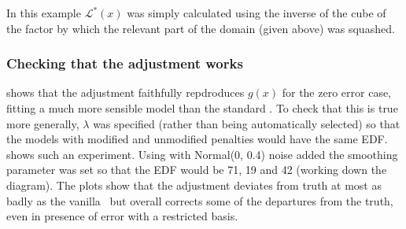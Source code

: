 {In this example $\mathcal{L}^*(x)$ was simply calculated using the inverse of the cube of the factor by which the relevant part of the domain (given above) was squashed. 

\subsubsection{Checking that the adjustment works}

 shows that the adjustment faithfully repdroduces $g(x)$ for the zero error case, fitting a much more sensible model than the standard \tprs. To check that this is true more generally, $\lambda$ was specified (rather than being automatically selected) so that the models with modified and unmodified penalties would have the same EDF.  shows such an experiment. Using  with Normal(0, 0.4) noise added the smoothing parameter was set so that the EDF would be 71, 19 and 42 (working down the diagram). The plots show that the adjustment deviates from truth at most as badly as the vanilla \tprs\ but overall corrects some of the departures from the truth, even in presence of error with a restricted basis.

}
